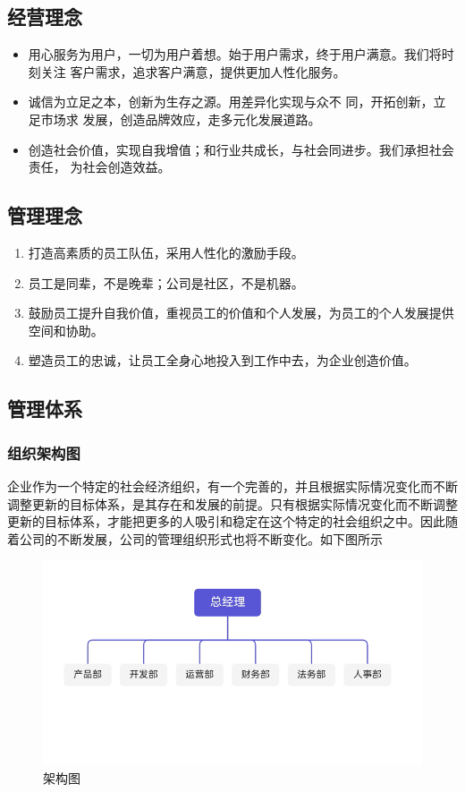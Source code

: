 \documentclass[master]{hduthesis}
\begin{document}
\subsection{经营理念}
\begin{itemize}
	\item 用心服务为用户，一切为用户着想。始于用户需求，终于用户满意。我们将时刻关注 客户需求，追求客户满意，提供更加人性化服务。
	\item 诚信为立足之本，创新为生存之源。用差异化实现与众不   同，开拓创新，立足市场求 发展，创造品牌效应，走多元化发展道路。
	\item 创造社会价值，实现自我增值；和行业共成长，与社会同进步。我们承担社会责任， 为社会创造效益。
\end{itemize}
\subsection{管理理念}

\begin{enumerate}[1.]
	\item 打造高素质的员工队伍，采用人性化的激励手段。
	\item 员工是同辈，不是晚辈；公司是社区，不是机器。
	\item 鼓励员工提升自我价值，重视员工的价值和个人发展，为员工的个人发展提供空间和协助。
	\item 塑造员工的忠诚，让员工全身心地投入到工作中去，为企业创造价值。
\end{enumerate}
\subsection{管理体系}
\subsubsection{组织架构图}
企业作为一个特定的社会经济组织，有一个完善的，并且根据实际情况变化而不断调整更新的目标体系，是其存在和发展的前提。只有根据实际情况变化而不断调整更新的目标体系，才能把更多的人吸引和稳定在这个特定的社会组织之中。因此随着公司的不断发展，公司的管理组织形式也将不断变化。如下图所示
\begin{figure}[H]
	\centering
	\includegraphics{Picture1.png}
	\caption{架构图}

\end{figure}
\end{document}
